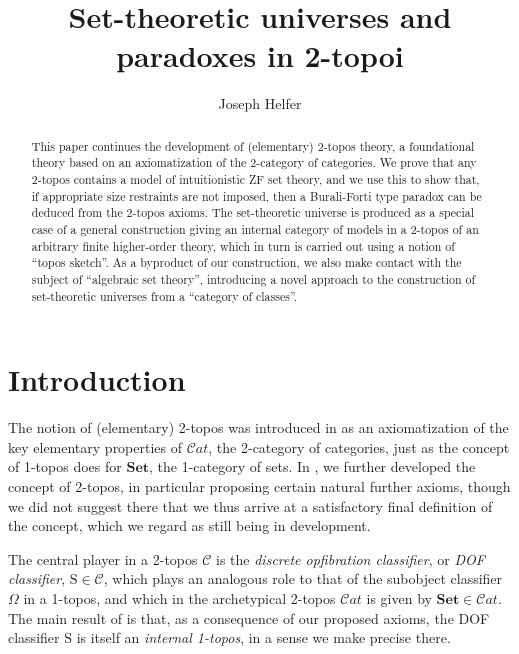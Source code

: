 \documentclass{amsart}
\title{Set-theoretic universes and paradoxes in 2-topoi}
\author{Joseph Helfer}
\date{}
\newcommand\Cat{\mathcal{C}at}
\newcommand\cC{\mathcal{C}}
\newcommand\rS{\mathrm{S}}
\newcommand\Set{\mathbf{Set}}
\theoremstyle{definition}
\theoremstyle{remark}
\theoremstyle{plainwithref}
\begin{document}
\begin{abstract}
  This paper continues the development of (elementary) 2-topos theory, a foundational theory based on an axiomatization of the 2-category of categories.
  We prove that any 2-topos contains a model of intuitionistic ZF set theory, and we use this to show that, if appropriate size restraints are not imposed, then a Burali-Forti type paradox can be deduced from the 2-topos axioms.
  The set-theoretic universe is produced as a special case of a general construction giving an internal category of models in a 2-topos of an arbitrary finite higher-order theory, which in turn is carried out using a notion of ``topos sketch''.
  As a byproduct of our construction, we also make contact with the subject of ``algebraic set theory'', introducing a novel approach to the construction of set-theoretic universes from a ``category of classes''.
\end{abstract}

\maketitle

\etocsettocstyle{\hfill\textsc{\contentsname}\hfill\,}{}

\tableofcontents

\section{Introduction}
The notion of (elementary) 2-topos was introduced in \cite{weber-2-toposes} as an axiomatization of the key elementary properties of \( \Cat \), the 2-category of categories, just as the concept of 1-topos does for \( \Set \), the 1-category of sets.
In \cite{helfer-topoi-in-topoi}, we further developed the concept of 2-topos, in particular proposing certain natural further axioms, though we did not suggest there that we thus arrive at a satisfactory final definition of the concept, which we regard as still being in development.

The central player in a 2-topos \( \cC \) is the \emph{discrete opfibration classifier}, or \emph{DOF classifier}, \( \rS \in \cC \), which plays an analogous role to that of the subobject classifier \( \Omega \) in a 1-topos, and which in the archetypical 2-topos \( \Cat \) is given by \( \Set \in \Cat \).
The main result of \cite{helfer-topoi-in-topoi} is that, as a consequence of our proposed axioms, the DOF classifier \( \rS \) is itself an \emph{internal 1-topos}, in a sense we make precise there.
\end{document}
